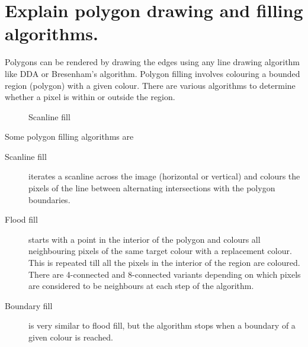 \documentclass[a4paper,14pt,english,crop=false]{standalone}
\begin{document}
\section{Explain polygon drawing and filling algorithms.}
Polygons can be rendered by drawing the edges using any line drawing algorithm
like DDA or Bresenham's algorithm.
Polygon filling involves colouring a bounded region (polygon) with a given
colour. There are various algorithms to determine whether a pixel is within or
outside the region.\\
\begin{figure}[h]
  \centering
  
  \caption{Scanline fill}
\end{figure}
Some polygon filling algorithms are
\begin{description}
  \item [Scanline fill] {iterates a scanline across the image (horizontal or
      vertical) and colours the pixels of the line between alternating
      intersections with the polygon boundaries.}
  \item [Flood fill] {starts with a point in the interior of
      the polygon and colours all neighbouring pixels of the same target colour
      with a replacement colour. This is repeated till all the pixels in the
      interior of the region are coloured. There are 4-connected and
      8-connected variants depending on which pixels are considered to be
      neighbours at each step of the algorithm.}
  \item [Boundary fill] {is very similar to flood fill, but the algorithm stops
      when a boundary of a given colour is reached.}
\end{description}
\end{document}
